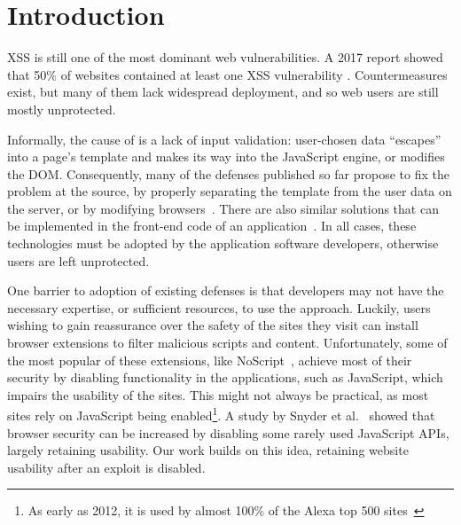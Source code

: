 \section{Introduction} \label{introduction}

\ac{XSS} is still one of the most dominant web vulnerabilities. A 2017
report showed that 50\% of websites contained at least one \ac{XSS}
vulnerability \cite{Acunetix}. Countermeasures exist, but many of them
lack widespread deployment, and so web users are still mostly
unprotected.

Informally, the cause of \xss is a lack of input validation:
user-chosen data ``escapes'' into a page's template and makes its way
into the JavaScript engine, or modifies the DOM.
%
Consequently, many of the \xss defenses published so far
propose to fix the problem at the source, by properly separating the
template from the user data on the server, or by modifying
browsers~\cite{Jim:2007:DSI:1242572.1242654,nadji2009document,Wurzinger:2009:SMX:1656360.1656379,Sundareswaran:2012:XHS:2352970.2352994}.
%
There are also similar solutions that can be implemented in the
front-end code of an application~\cite{10.1007/978-3-319-66399-9_7}.
In all cases, these technologies must be adopted by the application
software developers, otherwise users are left unprotected.

One barrier to adoption of existing \xss defenses is that developers may not have the
necessary expertise, or sufficient resources, to use the approach.
%
%
Luckily, users wishing to gain reassurance over the safety of the
sites they visit can install browser extensions to filter malicious
scripts and content. Unfortunately, some of the most popular of these
extensions, like NoScript~\cite{Noscript}, achieve most of their security
by disabling functionality in the applications, such as JavaScript, which
impairs the usability of the sites. This might not always be practical,
as most sites rely on JavaScript being enabled\footnote{As early as 2012, 
it is used by almost 100\% of the Alexa top 500 sites~\cite{Stock:2017:WTI:3241189.3241265}}.
A study by Snyder et al.~\cite{Snyder:2017:MWD:3133956.3133966}
showed that browser security can be increased by disabling some rarely used
JavaScript APIs, largely retaining usability. Our work builds on this idea,
retaining website usability after an exploit is disabled.

